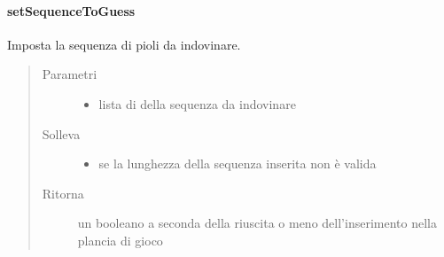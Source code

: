 \documentclass[letterpaper,10pt,italian]{sphinxmanual}
\begin{document}
\paragraph{setSequenceToGuess}
\label{\detokenize{source/it/unicam/cs/pa/mastermind/gamecore/BoardModel:setsequencetoguess}}

\begin{fulllineitems}
\label{\detokenize{source/it/unicam/cs/pa/mastermind/gamecore/BoardModel:it.unicam.cs.pa.mastermind.gamecore.BoardModel.setSequenceToGuess(List)}}
Imposta la sequenza di pioli da indovinare.
\begin{quote}\begin{description}
\item[{Parametri}] \leavevmode\begin{itemize}
\item {} 
 \textendash{} lista di  della sequenza da indovinare

\end{itemize}

\item[{Solleva}] \leavevmode\begin{itemize}
\item {} 
 \textendash{} se la lunghezza della sequenza inserita non è valida

\end{itemize}

\item[{Ritorna}] \leavevmode
un booleano a seconda della riuscita o meno dell’inserimento nella plancia di gioco

\end{description}\end{quote}

\end{fulllineitems}
\end{document}
